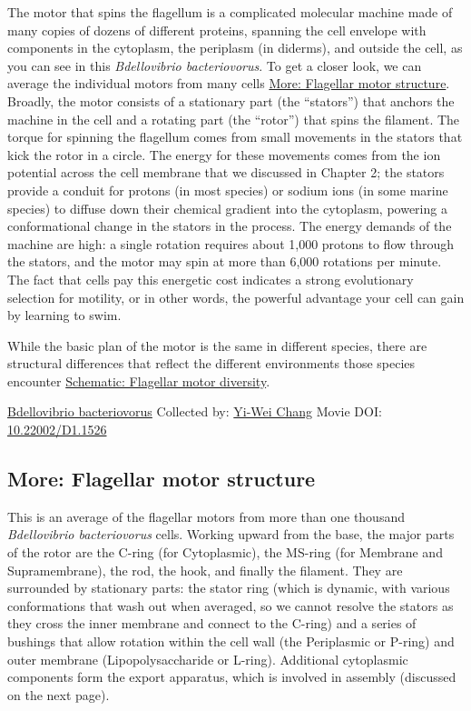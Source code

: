 \documentclass[]{tufte-book}
\begin{document}
The motor that spins the flagellum is a complicated molecular machine made of many copies of dozens of different proteins, spanning the cell envelope with components in the cytoplasm, the periplasm (in diderms), and outside the cell, as you can see in this \emph{Bdellovibrio bacteriovorus}. To get a closer look, we can average the individual motors from many cells \protect\hyperlink{Flagellar_motor_structure}{More: Flagellar motor structure}. Broadly, the motor consists of a stationary part (the ``stators'') that anchors the machine in the cell and a rotating part (the ``rotor'') that spins the filament. The torque for spinning the flagellum comes from small movements in the stators that kick the rotor in a circle. The energy for these movements comes from the ion potential across the cell membrane that we discussed in Chapter 2; the stators provide a conduit for protons (in most species) or sodium ions (in some marine species) to diffuse down their chemical gradient into the cytoplasm, powering a conformational change in the stators in the process. The energy demands of the machine are high: a single rotation requires about 1,000 protons to flow through the stators, and the motor may spin at more than 6,000 rotations per minute. The fact that cells pay this energetic cost indicates a strong evolutionary selection for motility, or in other words, the powerful advantage your cell can gain by learning to swim.

While the basic plan of the motor is the same in different species, there are structural differences that reflect the different environments those species encounter \protect\hyperlink{Flagellar_motor_diversity}{Schematic: Flagellar motor diversity}.



\hypertarget{htmlwidget-f46ff8b92bbebf94ed3c}{}

\label{fig:6-2}\protect\hyperlink{tree}{Bdellovibrio bacteriovorus} Collected by: \protect\hyperlink{yi-wei_chang}{Yi-Wei Chang} Movie DOI: \href{https://doi.org/10.22002/D1.1526}{10.22002/D1.1526}

\hypertarget{Flagellar_motor_structure}{%
\subsection*{More: Flagellar motor structure}\label{Flagellar_motor_structure}}

This is an average of the flagellar motors from more than one thousand \emph{Bdellovibrio bacteriovorus} cells. Working upward from the base, the major parts of the rotor are the C-ring (for Cytoplasmic), the MS-ring (for Membrane and Supramembrane), the rod, the hook, and finally the filament. They are surrounded by stationary parts: the stator ring (which is dynamic, with various conformations that wash out when averaged, so we cannot resolve the stators as they cross the inner membrane and connect to the C-ring) and a series of bushings that allow rotation within the cell wall (the Periplasmic or P-ring) and outer membrane (Lipopolysaccharide or L-ring). Additional cytoplasmic components form the export apparatus, which is involved in assembly (discussed on the next page).
\end{document}
